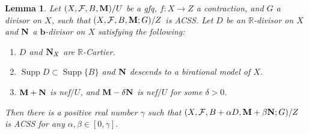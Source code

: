 \documentclass[11pt]{amsart}
\numberwithin{equation}{section}
\newcommand{\bb}{\bm{b}}
\newcommand{\Mm}{{\bf{M}}}
\newcommand{\Nn}{{\bf{N}}}
\newcommand{\Rr}{\mathbb{R}}
\newcommand{\Supp}{\operatorname{Supp}}
\newcommand{\Ff}{\mathcal{F}}
\newtheorem{lem}[thm]{Lemma}
\theoremstyle{definition}
\theoremstyle{definition}
\theoremstyle{definition}
\begin{document}
\begin{lem}\label{lem: acss f-triple perturb coefficient}
Let $(X,\Ff,B,\Mm)/U$ be a gfq, $f: X\rightarrow Z$ a contraction, and $G$ a divisor on $X$, such that $(X,\Ff,B,\Mm;G)/Z$ is ACSS. Let $D$ be an $\Rr$-divisor on $X$ and $\Nn$ a $\bb$-divisor on $X$ satisfying the following:
\begin{enumerate}
  \item $D$ and $\Nn_X$ are $\Rr$-Cartier.
  \item $\Supp D\subset\Supp\{B\}$ and $\Nn$ descends to a birational model of $X$.
  \item $\Mm+\Nn$ is nef$/U$, and $\Mm-\delta\Nn$ is nef$/U$ for some $\delta>0$.
\end{enumerate}
Then there is a positive real number $\gamma$ such that $(X,\Ff,B+\alpha D,\Mm+\beta\Nn;G)/Z$ is ACSS for any $\alpha,\beta\in [0,\gamma]$.
\end{lem}
\end{document}
